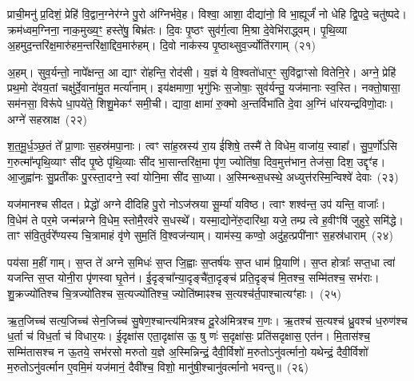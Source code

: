 {\anuvakamend[{दी॒या॒ दा॒यो ज॑यन्त्व॒मित्रा॒न्प्र च॑त्वारि॒ꣳ॒शच्च॑}]}%

प्राची॒मनु॑ प्र॒दिशं॒ प्रेहि॑ वि॒द्वान॒ग्नेर॑ग्ने पु॒रो अ॑ग्निर्भवे॒ह। विश्वा॒ आशा॒ दीद्या॑नो॒ वि भा॒ह्यूर्जं॑ नो धेहि द्वि॒पदे॒ चतु॑ष्पदे। क्रम॑ध्वम॒ग्निना॒ नाक॒मुख्य॒ꣳ॒ हस्ते॑षु॒ बिभ्र॑तः। दि॒वः पृ॒ष्ठꣳ सुव॑र्ग॒त्वा मि॒श्रा दे॒वेभि॑राद्ध्वम्। पृ॒थि॒व्या अ॒हमुद॒न्तरि॑क्ष॒मारु॑हम॒न्तरि॑क्षा॒द्दिव॒मारु॑हम्। दि॒वो नाक॑स्य पृ॒ष्ठाथ्सुव॒र्ज्योति॑रगाम्~(२१)

अ॒हम्। सुव॒र्यन्तो॒ नापे᳚क्षन्त॒ आ द्याꣳ रो॑हन्ति॒ रोद॑सी। य॒ज्ञं ये वि॒श्वतो॑धार॒ꣳ॒ सुवि॑द्वाꣳसो वितेनि॒रे। अग्ने॒ प्रेहि॑ प्रथ॒मो दे॑वय॒तां चक्षु॑र्दे॒वाना॑मु॒त मर्त्या॑नाम्। इय॑क्षमाणा॒ भृगु॑भिः स॒जोषाः॒ सुव॑र्यन्तु॒ यज॑मानाः स्व॒स्ति। नक्तो॒षासा॒ सम॑नसा॒ विरू॑पे धा॒पये॑ते॒ शिशु॒मेकꣳ॑ समी॒ची। द्यावा॒ क्षामा॑ रु॒क्मो अ॒न्तर्विभा॑ति दे॒वा अ॒ग्निं धा॑रयन्द्रविणो॒दाः। अग्ने॑ सहस्राक्ष~(२२)

श॒त॒मू॒र्ध॒ञ्छ॒तं ते᳚ प्रा॒णाः स॒हस्र॑मपा॒नाः। त्वꣳ सा॑ह॒स्रस्य॑ रा॒य ई॑शिषे॒ तस्मै॑ ते विधेम॒ वाजा॑य॒ स्वाहा᳚। सु॒प॒र्णो॑\-ऽसि ग॒रुत्मा᳚न्पृथि॒व्याꣳ सी॑द पृ॒ष्ठे पृ॑थि॒व्याः सी॑द भा॒सान्तरि॑क्ष॒मा पृ॑ण॒ ज्योति॑षा॒ दिव॒मुत्त॑भान॒ तेज॑सा॒ दिश॒ उद्दृꣳ॑ह। आ॒जुह्वा॑नः सु॒प्रती॑कः पु॒रस्ता॒दग्ने॒ स्वां योनि॒मा सी॑द सा॒ध्या। अ॒स्मिन्थ्स॒धस्थे॒ अध्युत्त॑रस्मि॒न्विश्वे॑ देवाः~(२३)

यज॑मानश्च सीदत। प्रेद्धो॑ अग्ने दीदिहि पु॒रो नो\-ऽज॑स्रया सू॒र्म्या॑ यविष्ठ। त्वाꣳ शश्व॑न्त॒ उप॑ यन्ति॒ वाजाः᳚। वि॒धेम॑ ते पर॒मे जन्म॑न्नग्ने वि॒धेम॒ स्तोमै॒रव॑रे स॒धस्थे᳚। यस्मा॒द्योने॑रु॒दारि॑था॒ यजे॒ तम्प्र त्वे ह॒वीꣳषि॑ जुहुरे॒ समि॑द्धे। ताꣳ स॑वि॒तुर्वरे᳚ण्यस्य चि॒त्रामाहं वृ॑णे सुम॒तिं वि॒श्वज॑न्याम्। याम॑स्य॒ कण्वो॒ अदु॑ह॒त्प्रपी॑नाꣳ स॒हस्र॑धाराम्~(२४)

पय॑सा म॒हीं गाम्। स॒प्त ते॑ अग्ने स॒मिधः॑ स॒प्त जि॒ह्वाः स॒प्तर्\mbox{}ष॑यः स॒प्त धाम॑ प्रि॒याणि॑। स॒प्त होत्राः᳚ सप्त॒धा त्वा॑ यजन्ति स॒प्त योनी॒रा पृ॑णस्वा घृ॒तेन॑। ई॒दृङ्चा᳚न्या॒दृङ्चै॑ता॒दृङ्च॑ प्रति॒दृङ्च॑ मि॒तश्च॒ सम्मि॑तश्च॒ सभ॑राः। शु॒क्रज्यो॑तिश्च चि॒त्रज्यो॑तिश्च स॒त्यज्यो॑तिश्च॒ ज्योति॑ष्माꣴश्च स॒त्यश्च॑र्त॒पाश्चात्यꣳ॑हाः।~(२५)

ऋ॒त॒जिच्च॑ सत्य॒जिच्च॑ सेन॒जिच्च॑ सु॒षेण॒श्चान्त्य॑मित्रश्च दू॒रेअ॑मित्रश्च ग॒णः। ऋ॒तश्च॑ स॒त्यश्च॑ ध्रु॒वश्च॑ ध॒रुण॑श्च ध॒र्ता च॑ विध॒र्ता च॑ विधार॒यः। ई॒दृक्षा॑स एता॒दृक्षा॑स ऊ॒ षु णः॑ स॒दृक्षा॑सः॒ प्रति॑सदृक्षास॒ एत॑न। मि॒तास॑श्च॒ सम्मि॑तासश्च न ऊ॒तये॒ सभ॑रसो मरुतो य॒ज्ञे अ॒स्मिन्निन्द्रं॒ दैवी॒र्विशो॑ म॒रुतो\-ऽनु॑वर्त्मानो॒ यथेन्द्रं॒ दैवी॒र्विशो॑ म॒रुतो\-ऽनु॑वर्त्मान ए॒वमि॒मं यज॑मानं॒ दैवी᳚श्च॒ विशो॒ मानु॑षी॒श्चानु॑वर्त्मानो भवन्तु॥~(२६)

